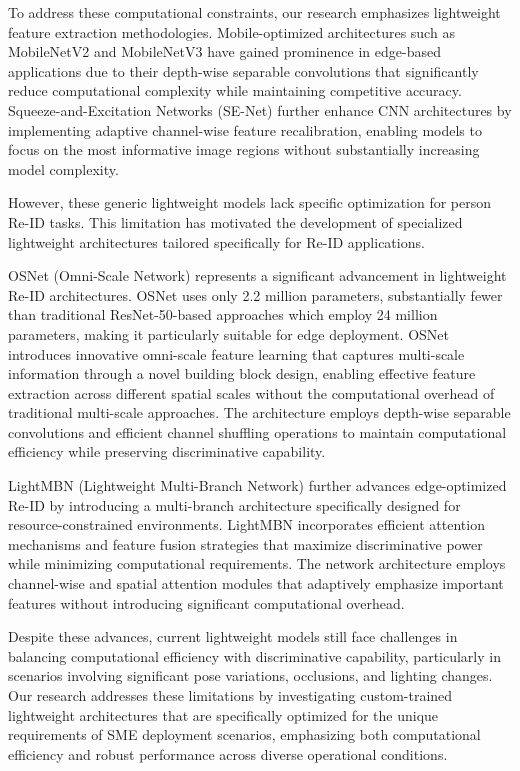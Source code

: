 \documentclass[../main.tex]{subfiles}
\begin{document}
To address these computational constraints, our research emphasizes lightweight feature extraction methodologies. Mobile-optimized architectures such as MobileNetV2 \cite{sandler2019mobilenetv2invertedresidualslinear} and MobileNetV3 \cite{howard2019searchingmobilenetv3} have gained prominence in edge-based applications due to their depth-wise separable convolutions that significantly reduce computational complexity while maintaining competitive accuracy. Squeeze-and-Excitation Networks (SE-Net) \cite{hu2019squeezeandexcitationnetworks} further enhance CNN architectures by implementing adaptive channel-wise feature recalibration, enabling models to focus on the most informative image regions without substantially increasing model complexity.

However, these generic lightweight models lack specific optimization for person Re-ID tasks. This limitation has motivated the development of specialized lightweight architectures tailored specifically for Re-ID applications.

OSNet (Omni-Scale Network) \cite{zhou2019omniscalefeaturelearningperson} represents a significant advancement in lightweight Re-ID architectures. OSNet uses only 2.2 million parameters, substantially fewer than traditional ResNet-50-based approaches which employ 24 million parameters, making it particularly suitable for edge deployment. OSNet introduces innovative omni-scale feature learning that captures multi-scale information through a novel building block design, enabling effective feature extraction across different spatial scales without the computational overhead of traditional multi-scale approaches. The architecture employs depth-wise separable convolutions and efficient channel shuffling operations to maintain computational efficiency while preserving discriminative capability.

LightMBN (Lightweight Multi-Branch Network) \cite{Herzog_2021} further advances edge-optimized Re-ID by introducing a multi-branch architecture specifically designed for resource-constrained environments. LightMBN incorporates efficient attention mechanisms and feature fusion strategies that maximize discriminative power while minimizing computational requirements. The network architecture employs channel-wise and spatial attention modules that adaptively emphasize important features without introducing significant computational overhead.

Despite these advances, current lightweight models still face challenges in balancing computational efficiency with discriminative capability, particularly in scenarios involving significant pose variations, occlusions, and lighting changes. Our research addresses these limitations by investigating custom-trained lightweight architectures that are specifically optimized for the unique requirements of SME deployment scenarios, emphasizing both computational efficiency and robust performance across diverse operational conditions.
\end{document}
